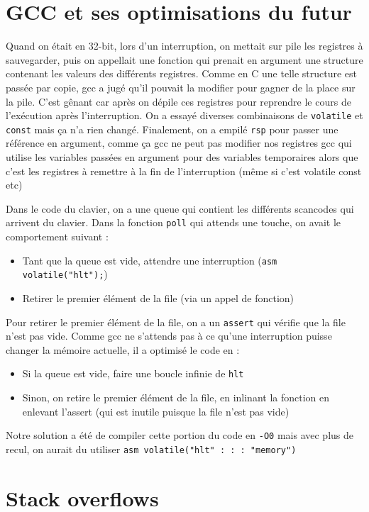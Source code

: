 \documentclass[12pt]{report}
\begin{document}
\section*{GCC et ses optimisations du futur}

Quand on était en 32-bit, lors d'un interruption, on mettait sur pile les registres à sauvegarder, puis on appellait une fonction qui prenait en argument une structure contenant les valeurs des différents registres.
Comme en C une telle structure est passée par copie, gcc a jugé qu'il pouvait la modifier pour gagner de la place sur la pile.
C'est gênant car après on dépile ces registres pour reprendre le cours de l'exécution après l'interruption.
On a essayé diverses combinaisons de \verb$volatile$ et \verb$const$ mais ça n'a rien changé.
Finalement, on a empilé \verb$rsp$ pour passer une référence en argument, comme ça gcc ne peut pas modifier nos registres
gcc qui utilise les variables passées en argument pour des variables temporaires alors que c'est les registres à remettre à la fin de l'interruption (même si c'est volatile const etc)

Dans le code du clavier, on a une queue qui contient les différents scancodes qui arrivent du clavier. Dans la fonction \verb$poll$ qui attends une touche, on avait le comportement suivant :
\begin{itemize}
    \item Tant que la queue est vide, attendre une interruption (\verb$asm volatile("hlt");$)
    \item Retirer le premier élément de la file (via un appel de fonction)
\end{itemize}

Pour retirer le premier élément de la file, on a un \verb$assert$ qui vérifie que la file n'est pas vide.
Comme gcc ne s'attends pas à ce qu'une interruption puisse changer la mémoire actuelle, il a optimisé le code en :
\begin{itemize}
    \item Si la queue est vide, faire une boucle infinie de \verb$hlt$
    \item Sinon, on retire le premier élément de la file, en inlinant la fonction en enlevant l'assert (qui est inutile puisque la file n'est pas vide)
\end{itemize}
Notre solution a été de compiler cette portion du code en \verb$-O0$ mais avec plus de recul, on aurait du utiliser \verb$asm volatile("hlt" : : : "memory")$

\section*{Stack overflows}
\end{document}
